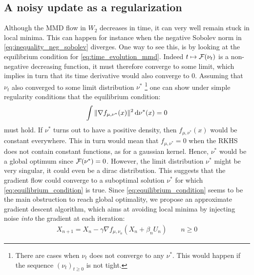 

\subsection{A noisy update as a regularization}\label{sec:noisy_flow}

Although the MMD flow in $W_2$ decreases in time, it can very well
 remain stuck in local minima. This can happen for instance when the negative Sobolev norm in \eqref{eq:inequality_neg_sobolev} diverges. One way to see this, is by looking at the equilibrium condition for \cref{eq:time_evolution_mmd}.
Indeed $t \mapsto {{\mathcal F}}(\nu_t)$ is a non-negative decreasing function, it must therefore converge to some limit, which implies in turn that its time derivative would also converge to $0$. Assuming that $\nu_t$ also converged to some limit distribution $\nu^{*}$
\footnote{There are cases when $\nu_t$ does not converge to any $\nu^*$. This would happen if the sequence $(\nu_t)_{t\geq 0}$ is not tight.} 
one can show under simple regularity conditions  that the equilibrium condition:
\begin{align}\label{eq:equilibrium_condition}
	\int \Vert \nabla f_{\mu,\nu^{*}}(x)\Vert^2 \mathop{}\!\mathrm{d} \nu^{*}(x) =0  
\end{align}
must hold. If $\nu^*$ turns out to have a positive density, then $f_{\mu,\nu^{*}}(x)$ would be constant everywhere. This in turn would mean that $f_{\mu,\nu^{*}}=0$ when the RKHS does not contain constant functions, as for a gaussian kernel. Hence, $\nu^*$ would be a global optimum since ${{\mathcal F}}(\nu^{*})=0$. However, the limit distribution $\nu^*$  might be very singular, it could even be a dirac distribution.   This suggests that the gradient flow could converge to a suboptimal solution $\nu^*$ for which \cref{eq:equilibrium_condition} is true. 
Since \cref{eq:equilibrium_condition} seems to be the main obstruction to reach global optimality, we propose an approximate gradient descent algorithm, which aims at avoiding local minima by injecting noise \textit{into} the gradient at each iteration:  
\begin{align}\label{eq:discretized_noisy_flow}
	X_{n+1} = X_{n} -\gamma \nabla f_{\mu,\nu_n}(X_n+ \beta_n U_n) \qquad n\geq 0
\end{align}
